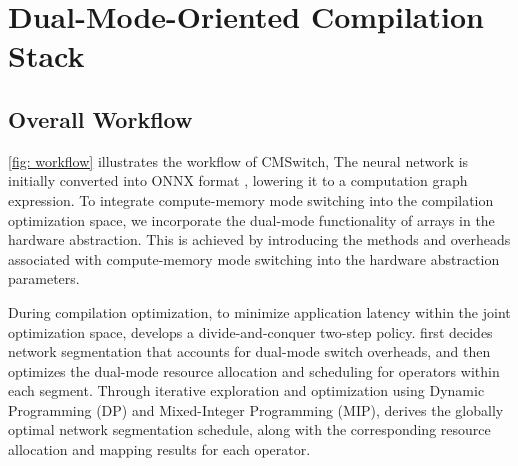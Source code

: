 
\section{Dual-Mode-Oriented Compilation Stack}

\subsection{Overall Workflow}
\fig \ref{fig: workflow} illustrates the workflow of CMSwitch, 
The neural network is initially converted into ONNX format \cite{bai2019}, lowering it to a computation graph expression.
 To integrate compute-memory mode switching into the compilation optimization space, we incorporate the dual-mode functionality of arrays in the hardware abstraction. This is achieved by introducing the methods and overheads associated with compute-memory mode switching into the hardware abstraction parameters.
 
 During compilation optimization, 
to minimize application latency within the joint optimization space, \name develops a divide-and-conquer two-step policy.
\name first decides network segmentation that accounts for dual-mode switch overheads, and then optimizes the dual-mode resource allocation and scheduling for operators within each segment.
Through iterative exploration and optimization using Dynamic Programming (DP) and Mixed-Integer Programming (MIP), \name derives the globally optimal network segmentation schedule, along with the corresponding resource allocation and mapping results for each operator.

